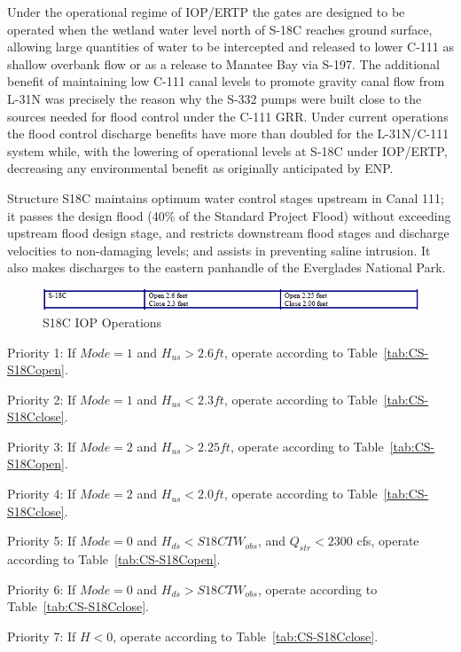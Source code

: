 Under the operational regime of IOP/ERTP the gates are designed to be operated when the wetland water level north of S-18C reaches ground surface, allowing large quantities of water to be intercepted and released to lower C-111 as shallow overbank flow or as a release to Manatee Bay via S-197.
The additional benefit of maintaining low C-111 canal levels to promote gravity canal flow from L-31N was precisely the reason why the S-332 pumps were built close to the sources needed for flood control under the C-111 GRR.
Under current operations the flood control discharge benefits have more than doubled for the L-31N/C-111 system while, with the lowering of operational levels at S-18C under IOP/ERTP, decreasing any environmental benefit as originally anticipated by ENP.

Structure S18C maintains optimum water control stages upstream in Canal 111; it passes the design flood (40\% of the Standard Project Flood) without exceeding upstream flood design stage, and restricts downstream flood stages and discharge velocities to non-damaging levels; and assists in preventing saline intrusion. It also makes discharges to the eastern panhandle of the Everglades National Park.


\begin{figure}[!h]
  \begin{center}
  \includegraphics[width=6.5in]{../figs/S18C_IOPops.png}
  \caption{S18C IOP Operations}
  \label{fig:S18Ciop}
  \end{center}
\end{figure}


\begin{packed_items}
\item Priority 1: If $Mode=1$ and $H_{us}>2.6 ft$, operate according to Table~\ref{tab:CS-S18Copen}.
\item Priority 2: If $Mode=1$ and $H_{us}<2.3 ft$, operate according to Table~\ref{tab:CS-S18Cclose}.
\item[]
\item Priority 3: If $Mode=2$ and $H_{us}>2.25 ft$, operate according to Table~\ref{tab:CS-S18Copen}.
\item Priority 4: If $Mode=2$ and $H_{us}<2.0 ft$, operate according to Table~\ref{tab:CS-S18Cclose}.
\item[]
\item Priority 5: If $Mode=0$ and $H_{ds}<S18CTW_{obs}$, and $Q_{str}<2300$ cfs, operate according to Table~\ref{tab:CS-S18Copen}.
\item Priority 6: If $Mode=0$ and $H_{ds}>S18CTW_{obs}$, operate according to Table~\ref{tab:CS-S18Cclose}.
\item[]
\item Priority 7: If $H<0$, operate according to Table~\ref{tab:CS-S18Cclose}.
\end{packed_items}

